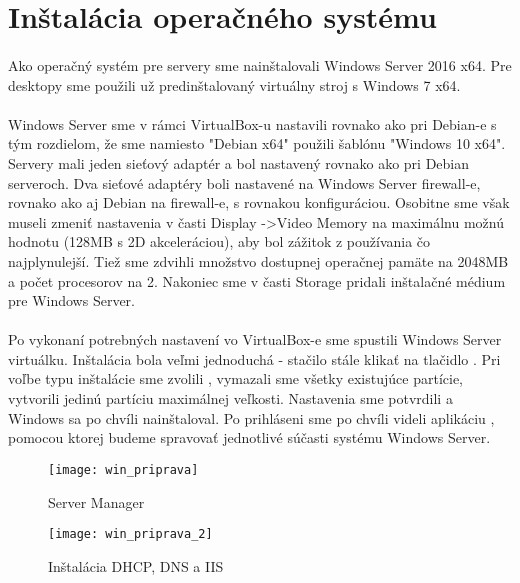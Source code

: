 \section{Inštalácia operačného systému}
\paragraph{}
Ako operačný systém pre servery sme nainštalovali Windows Server 2016 x64. Pre desktopy sme použili už predinštalovaný virtuálny stroj s Windows 7 x64.

\paragraph{}
Windows Server sme v rámci VirtualBox-u nastavili rovnako ako pri Debian-e s tým rozdielom, že sme namiesto "Debian x64" použili šablónu "Windows 10 x64". Servery mali jeden sieťový adaptér a bol nastavený rovnako ako pri Debian serveroch. Dva sieťové adaptéry boli nastavené na Windows Server firewall-e, rovnako ako aj Debian na firewall-e, s rovnakou konfiguráciou. Osobitne sme však museli zmeniť nastavenia v časti Display -\textgreater Video Memory na maximálnu možnú hodnotu (128MB s 2D akceleráciou), aby bol zážitok z používania čo najplynulejší. Tiež sme zdvihli množstvo dostupnej operačnej pamäte na 2048MB a počet procesorov na 2. Nakoniec sme v časti Storage pridali inštalačné médium pre Windows Server.

\paragraph{}
Po vykonaní potrebných nastavení vo VirtualBox-e sme spustili Windows Server virtuálku. Inštalácia bola veľmi jednoduchá - stačilo stále klikať na tlačidlo . Pri voľbe typu inštalácie sme zvolili , vymazali sme všetky existujúce partície, vytvorili jedinú partíciu maximálnej veľkosti. Nastavenia sme potvrdili a Windows sa po chvíli nainštaloval. Po prihláseni sme po chvíli videli aplikáciu  , pomocou ktorej budeme spravovať jednotlivé súčasti systému Windows Server.

\begin{figure}[!htb]
\centering
\texttt{[image: win\_priprava]}
\caption{Server Manager}
\label{fig:x win_server_man}
\end{figure}

\begin{figure}[!htb]
\centering
\texttt{[image: win\_priprava\_2]}
\caption{Inštalácia DHCP, DNS a IIS}
\label{fig:x win_prep_2}
\end{figure}


